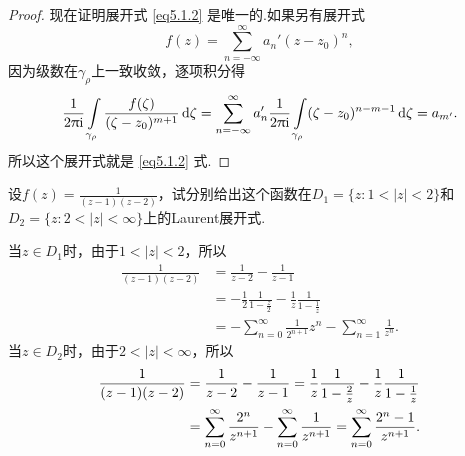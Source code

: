 \begin{proof}
  现在证明展开式 \eqref{eq5.1.2} 是唯一的.如果另有展开式
  \[
    f(z) = \sum_{n=-\infty}^{\infty}a_n'(z-z_0)^n,
  \]
  因为级数在$\gamma_\rho$上一致收敛，逐项积分得
  \[
    \frac1{2\uppi\mathrm i}\int\limits_{\gamma_\rho}
    \frac{f(\zeta)}{(\zeta-z_0)^{m+1}}\mathop{}\!\mathrm{d} \zeta
    = \sum_{n=-\infty}^\infty a_n'\frac1{2\uppi\mathrm i}
    \int\limits_{\gamma_\rho}(\zeta-z_0)^{n-m-1}\mathop{}\!\mathrm{d} \zeta=a_{m'}.
  \]
  所以这个展开式就是 \eqref{eq5.1.2} 式.
\end{proof}

\begin{example}\label{exam5.1.3}
  设$f(z)=\frac1{(z-1)(z-2)}$，试分别给出这个函数在$D_1=\{z:1<|z|<2\}$和$D_2=\{z:2<|z|<\infty\}$上的Laurent展开式.
\end{example}
\begin{solution}
  当$z\in D_1$时，由于$1<|z|<2$，所以
  \begin{align*}
    \frac1{(z-1)(z-2)} & = \frac1{z-2}-\frac1{z-1}\\
    & = -\frac12\frac1{1-\frac z2}-\frac1z\frac1{1-\frac1z}\\
    & = -\sum_{n=0}^\infty\frac1{2^{n+1}}z^n-\sum_{n=1}^\infty\frac1{z^n}.
  \end{align*}
  当$z\in D_2$时，由于$2<|z|<\infty$，所以
  \begin{align*}
    \frac1{(z-1)(z-2)} & = \frac1{z-2}-\frac1{z-1}
    = \frac1z \frac1{1-\frac2z} - \frac1z \frac1{1-\frac1z}\\
    & = \sum_{n=0}^\infty\frac{2^n}{z^{n+1}} - \sum_{n=0}^\infty\frac1{z^{n+1}}
    =\sum_{n=0}^\infty\frac{2^n-1}{z^{n+1}}. \qedhere
  \end{align*}
\end{solution}

